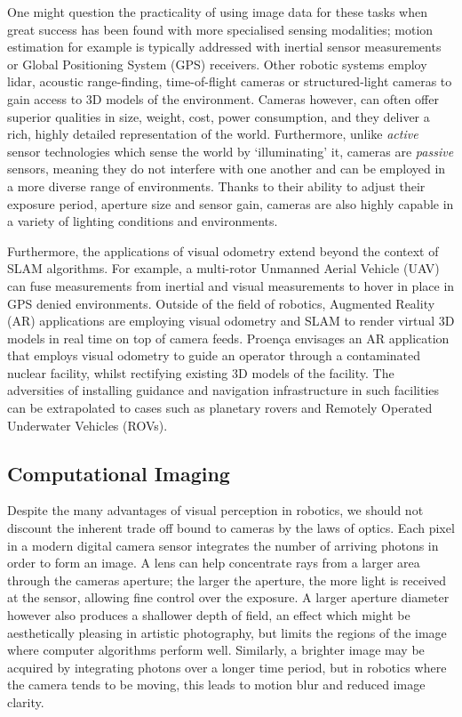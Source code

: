 One might question the practicality of using image data for these tasks when great success has been found with more specialised sensing modalities; motion estimation for example is typically addressed with inertial sensor measurements or Global Positioning System (GPS) receivers. Other robotic systems employ lidar, acoustic range-finding, time-of-flight cameras or structured-light cameras to gain access to 3D models of the environment. Cameras however, can often offer superior qualities in size, weight, cost, power consumption, and they deliver a rich, highly detailed representation of the world. Furthermore, unlike \textit{active} sensor technologies which sense the world by `illuminating' it, cameras are \textit{passive} sensors, meaning they do not interfere with one another and can be employed in a more diverse range of environments. Thanks to their ability to adjust their exposure period, aperture size and sensor gain, cameras are also highly capable in a variety of lighting conditions and environments. 

Furthermore, the applications of visual odometry extend beyond the context of SLAM algorithms. For example, a multi-rotor Unmanned Aerial Vehicle (UAV) can fuse measurements from inertial and visual measurements to hover in place in GPS denied environments. Outside of the field of robotics, Augmented Reality (AR) applications are employing visual odometry and SLAM to render virtual 3D models in real time on top of camera feeds. Proença \cite{proenca2018rgbd} envisages an AR application that employs visual odometry to guide an operator through a contaminated nuclear facility, whilst rectifying existing 3D models of the facility. The adversities of installing guidance and navigation infrastructure in such facilities can be extrapolated to cases such as planetary rovers and Remotely Operated Underwater Vehicles (ROVs).


\subsection{Computational Imaging}

Despite the many advantages of visual perception in robotics, we should not discount the inherent trade off bound to cameras by the laws of optics. Each pixel in a modern digital camera sensor integrates the number of arriving photons in order to form an image. A lens can help concentrate rays from a larger area through the cameras aperture; the larger the aperture, the more light is received at the sensor, allowing fine control over the exposure. A larger aperture diameter however also produces a shallower depth of field, an effect which might be aesthetically pleasing in artistic photography, but limits the regions of the image where computer algorithms perform well. Similarly, a brighter image may be acquired by integrating photons over a longer time period, but in robotics where the camera tends to be moving, this leads to motion blur and reduced image clarity.

